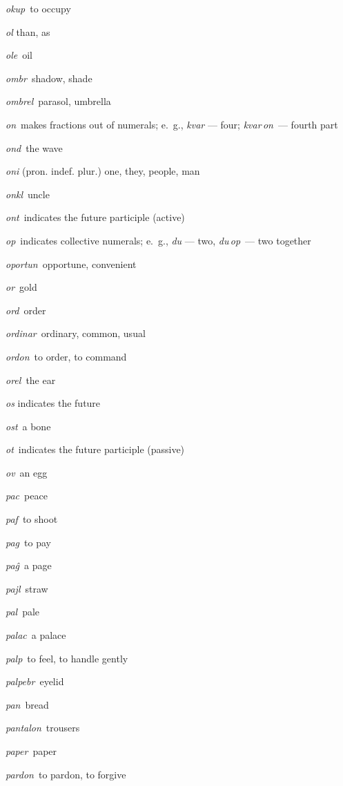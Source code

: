 \begin{landscape}
\begin{multicols}{5}
\begin{outdent}{1em}
\emph{okup\,} to occupy

\emph{ol} than, as

\emph{ole\,} oil

\emph{ombr\,} shadow, shade

\emph{ombrel\,} parasol, umbrella

\emph{on\,} makes fractions out of numerals; e.~g., \emph{kvar} — four; \emph{kvar\,on\,} — fourth part

\emph{ond\,} the wave

\emph{oni} (pron. indef. plur.) one, they, people, man

\emph{onkl\,} uncle

\emph{ont\,} indicates the future participle (active)

\emph{op\,} indicates collective numerals; e.~g., \emph{du} — two, \emph{du\,op\,} — two together

\emph{oportun\,} opportune, convenient

\emph{or\,} gold

\emph{ord\,} order

\emph{ordinar\,} ordinary, common, usual

\emph{ordon\,} to order, to command

\emph{orel\,} the ear

\emph{os} indicates the future

\emph{ost\,} a bone

\emph{ot\,} indicates the future participle (passive)

\emph{ov\,} an egg
\end{outdent}


\begin{outdent}{1em}
\emph{pac\,} peace

\emph{paf\,} to shoot

\emph{pag\,} to pay

\emph{paĝ\,} a page

\emph{pajl\,} straw

\emph{pal\,} pale

\emph{palac\,} a palace

\emph{palp\,} to feel, to handle gently

\emph{palpebr\,} eyelid

\emph{pan\,} bread

\emph{pantalon\,} trousers

\emph{paper\,} paper

\emph{pardon\,} to pardon, to forgive


\end{outdent}
\end{multicols}
\end{landscape}
